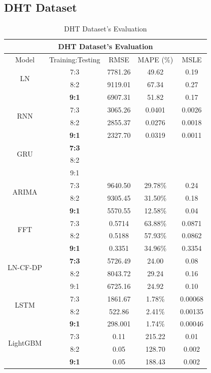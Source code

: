 \documentclass{ieeeojies}
\begin{document}
\subsection{DHT Dataset} 
\begin{table}[H]
    \centering
    \begin{tabular}{|c|c|c|c|c|}
         \hline
         \multicolumn{5}{|c|}{\textbf{DHT Dataset's Evaluation}}\\
         \hline
         \centering Model & Training:Testing & RMSE & MAPE (\%) & MSLE\\
         \hline
         \multirow{2}{*}{LN}& 7:3 & 7781.26 & 49.62 & 0.19\\ & 8:2 & 9119.01 & 67.34 & 0.27\\ & \textbf{9:1}& 6907.31& 51.82 & 0.17\\
         \hline
         \multirow{2}{*}{RNN} & 7:3&3065.26&0.0401&0.0026\\ & 8:2&2855.37&0.0276&0.0018\\ & \textbf{9:1} &2327.70 &0.0319 & 0.0011\\
         \hline
         \multirow{2}{*}{GRU} & \textbf{7:3}	& & & \\ & 8:2 & & & \\ & 9:1 & & & \\
         \hline
         \multirow{2}{*}{ARIMA} & 7:3 & 9640.50 & 29.78\% &0.24 \\ & 8:2 & 9305.45 &31.50\% & 0.18\\ & \textbf{9:1} &5570.55 &12.58\% & 0.04\\
         \hline
         \multirow{2}{*}{FFT}& 7:3	& 0.5714& 63.88\%& 0.0871\\ & 8:2 & 0.5188& 57.93\%& 0.0862\\ & \textbf{9:1} & 0.3351& 34.96\%& 0.3354\\
         \hline
         \multirow{2}{*}{LN-CF-DP} & \textbf{7:3} & 5726.49&24.00&0.08 \\ & {8:2} &8043.72& 29.24& 0.16\\ & 9:1 &6725.16&24.92&0.10\\
         \hline
         \multirow{2}{*}{LSTM}& 7:3& 1861.67& 1.78\%& 0.00068\\ & 8:2 & 522.86& 2.41\%& 0.00135\\ & \textbf{9:1}& 298.001& 1.74\%& 0.00046\\
         \hline
         \multirow{2}{*}{LightGBM}& 7:3& 0.11& 215.22 & 0.01\\ & 8:2 & 0.05& 128.70 & 0.002\\ & \textbf{9:1}& 0.05& 188.43 & 0.002\\
         \hline
    \end{tabular}
    \caption{DHT Dataset's Evaluation}
    \label{dhtresult}
\end{table}
\end{document}
